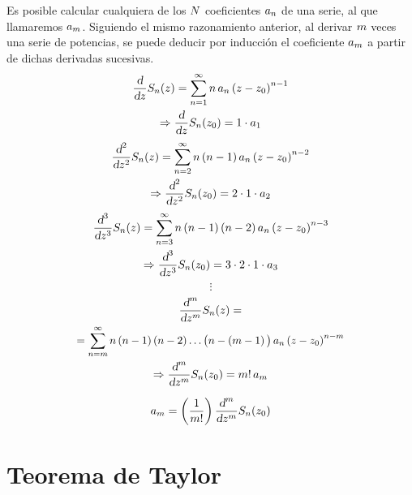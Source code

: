 Es posible calcular cualquiera de los $N$ coeficientes $a_n$ de una serie, al que llamaremos $a_m$.
Siguiendo el mismo razonamiento anterior, al derivar $m$ veces una serie de potencias, se puede deducir por inducción el coeficiente $a_m$ a partir de dichas derivadas sucesivas.
\begin{multline*}
    \frac{\textsl{d}}{\textsl{d} z} S_n(z) = \sum_{n=1}^\infty n \, a_n \left(z-z_0\right)^{n-1}
    \\
    \Rightarrow \frac{\textsl{d}}{\textsl{d} z} S_n(z_0) = 1 \cdot a_1
\end{multline*}
\begin{multline*}
    \frac{\textsl{d}^2}{\textsl{d} z^2} S_n(z) = \sum_{n=2}^\infty n \left(n-1\right) a_n \left(z-z_0\right)^{n-2}
    \\
    \Rightarrow \frac{\textsl{d}^2}{\textsl{d} z^2} S_n(z_0) = 2 \cdot 1 \cdot a_2
\end{multline*}
\begin{multline*}
    \frac{\textsl{d}^3}{\textsl{d} z^3} S_n(z) = \sum_{n=3}^\infty n \left(n-1\right) \left(n-2\right) a_n \left(z-z_0\right)^{n-3}
    \\
    \Rightarrow \frac{\textsl{d}^3}{\textsl{d} z^3} S_n(z_0) = 3 \cdot 2 \cdot 1 \cdot a_3
\end{multline*}
\begin{equation*}
    \vdots
\end{equation*}
\begin{multline*}
    \frac{\dif^\mth}{\dif z^\mth} S_\nth (z) =
    \\
    \scale{0.96}{
    = \sum_{\nth=\mth}^\infty \nth \left(\nth-1\right) \left(\nth-2\right) \dots \big( \nth-\left(\mth-1\right) \big) \, a_\nth \left(z-z_0\right)^{\nth-\mth}
    }
    \\
    \Rightarrow \frac{\dif^\mth}{\dif z^\mth} S_\nth(z_0) = \mth! \, a_\mth
\end{multline*}

\begin{mdframed}[style=DefinitionFrame]
    \begin{defn}
    \end{defn}
    \begin{equation*}
        a_m = \left( \frac{1}{m!} \right) \frac{\textsl{d}^m}{\textsl{d} z^m} S_n(z_0)
    \end{equation*}
\end{mdframed}


\section{Teorema de Taylor}

